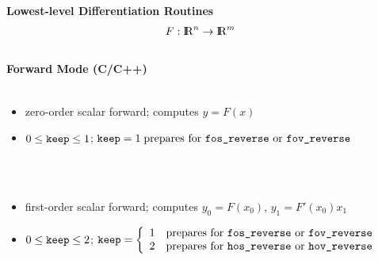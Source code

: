 \documentclass[12pt,oneside,a4paper]{article}
\newcommand{\R}{{ {\rm I} \kern -.225em {\rm R} }}
\begin{document}
\newpage
\begin{center}\Large
{\Huge \bf Lowest-level Differentiation Routines}\\[-0.5ex]
\begin{align*}
   & F:\R^n\rightarrow\R^m
\end{align*}\\[0.5ex]
{\Large \bf  Forward Mode (C/C++)}\\[2ex]
%
\\[2ex]
\begin{minipage}[h]{14cm}
\small 
\begin{itemize}
\item zero-order scalar forward; computes $y=F\left(x\right)$
\item $0\leq\text{\tt keep}\leq 1$; 
      $\text{\tt keep}=1\;\text{prepares for {\tt fos\_reverse} 
                                          or {\tt fov\_reverse}}$
\end{itemize}
\end{minipage}\\[2ex]
%
\\[2ex]
\begin{minipage}[h]{14cm}
\small 
\begin{itemize}
\item first-order scalar forward; computes $y_0=F\left(x_0\right)$,
      $y_1=F'\left(x_0\right)x_1$
\item $0\leq\text{\tt keep}\leq 2$; 
      $\text{\tt keep} = \left\{\begin{array}{cl}
       1 & \text{prepares for {\tt fos\_reverse} or {\tt fov\_reverse}} \\
       2 & \text{prepares for {\tt hos\_reverse} or {\tt hov\_reverse}}
       \end{array}\right.$ 
\end{itemize}
\end{minipage}\\[2ex]
%
\end{center}
\end{document}
